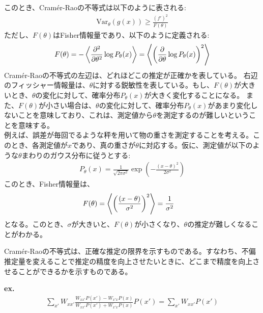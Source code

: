 \documentclass[a4paper,11pt]{jsarticle}
\numberwithin{equation}{section}
\begin{document}
このとき、Cram\'er-Raoの不等式は以下のように表される:
\begin{align}
    \text{Var}_{\theta}(g(x)) \geq \frac{(f')^2}{F(\theta)}
\end{align}
ただし、$F(\theta)$はFisher情報量であり、以下のように定義される:
\begin{align}
    F(\theta) = -\ev{\pdv[2]{\theta} \log P_{\theta}(x)} =\ev{\qty(\pdv{\theta} \log P_{\theta}(x))^2}
\end{align}
Cram\'er-Raoの不等式の左辺は、どれほどこの推定が正確かを表している。
右辺のフィッシャー情報量は、$\theta$に対する鋭敏性を表している。もし、$F(\theta)$が大きいとき、$\theta$の変化に対して、確率分布$P_{\theta}(x)$が大きく変化することになる。
また、$F(\theta)$が小さい場合は、$\theta$の変化に対して、確率分布$P_{\theta}(x)$があまり変化しないことを意味しており、これは、測定値から$\theta$を測定するのが難しいということを意味する。\\


例えば、誤差が毎回でるような秤を用いて物の重さを測定することを考える。このとき、各測定値が$x$であり、真の重さが$\theta$に対応する。仮に、測定値が以下のような$\theta$まわりのガウス分布に従うとする:
\begin{align}
    P_{\theta}(x) = \frac{1}{\sqrt{2\pi \sigma^2}}\exp(-\frac{(x-\theta)^2}{2\sigma^2})
\end{align}
このとき、Fisher情報量は、
\begin{align}
    F(\theta) &= \ev{\qty(\frac{(x-\theta)}{\sigma^2})^2} = \frac{1}{\sigma^2}
\end{align}
となる。このとき、$\sigma$が大きいと、$F(\theta)$が小さくなり、$\theta$の推定が難しくなることがわかる。

Cram\'er-Raoの不等式は、正確な推定の限界を示すものである。すなわち、不偏推定量を変えることで推定の精度を向上させたいときに、どこまで精度を向上させることができるかを示すものである。

\textbf{ex.}\\

\begin{align}
    \sum_{x'} W_{xx'} \frac{W_{xx'}P(x')-W_{x'x}P(x)}{W_{xx'}P(x')+W_{x'x}P(x)} P(x') = \sum_{x'} W_{xx'}  P(x') 
\end{align}
\end{document}
